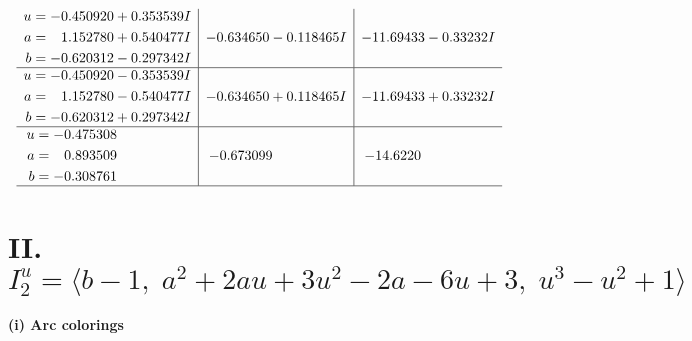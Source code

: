 \documentclass[1p]{elsarticle_modified}
\theoremstyle{definition}
\begin{document}
$$\begin{array}{c|c|c}
\begin{aligned}
u &= -0.450920 + 0.353539 I \\
a &= \phantom{-}1.152780 + 0.540477 I \\
b &= -0.620312 - 0.297342 I\end{aligned}
 & -0.634650 - 0.118465 I & -11.69433 - 0.33232 I \\ \hline\begin{aligned}
u &= -0.450920 - 0.353539 I \\
a &= \phantom{-}1.152780 - 0.540477 I \\
b &= -0.620312 + 0.297342 I\end{aligned}
 & -0.634650 + 0.118465 I & -11.69433 + 0.33232 I \\ \hline\begin{aligned}
u &= -0.475308\phantom{ +0.000000I} \\
a &= \phantom{-}0.893509\phantom{ +0.000000I} \\
b &= -0.308761\phantom{ +0.000000I}\end{aligned}
 & -0.673099\phantom{ +0.000000I} & -14.6220\phantom{ +0.000000I}\\
 \hline 
 \end{array}$$\newpage\newpage\renewcommand{\arraystretch}{1}
\centering \section*{II. $I^u_{2}= \langle b-1,\;a^2+2 a u+3 u^2-2 a-6 u+3,\;u^3- u^2+1 \rangle$}
\flushleft \textbf{(i) Arc colorings}\\
\end{document}
